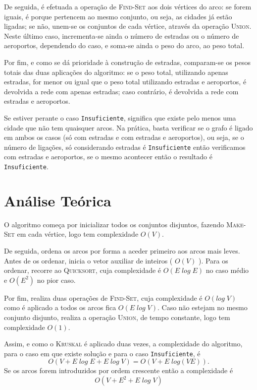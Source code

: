\documentclass[12pt]{article}
\begin{document}
De seguida, é efetuada a operação de \textsc{Find-Set} aos dois vértices do arco: se forem iguais, é porque pertencem ao mesmo conjunto, ou seja, as cidades já estão ligadas; se não, unem-se os conjuntos de cada vértice, através da operação \textsc{Union}. Neste último caso, incrementa-se ainda o número de estradas ou o número de aeroportos, dependendo do caso, e soma-se ainda o peso do arco, ao peso total.

Por fim, e como se dá prioridade à construção de estradas, comparam-se os pesos totais das duas aplicações do algoritmo: se o peso total, utilizando apenas estradas, for menor ou igual que o peso total utilizando estradas e aeroportos, é devolvida a rede com apenas estradas; caso contrário, é devolvida a rede com estradas e aeroportos.

Se estiver perante o caso \texttt{Insuficiente}, significa que existe pelo menos uma cidade que não tem quaisquer arcos. Na prática, basta verificar se o grafo é ligado em ambos os casos (só com estradas e com estradas e aeroportos), ou seja, se o número de ligações, só considerando estradas é \texttt{Insuficiente} então verificamos com estradas e aeroportos, se o mesmo acontecer então o resultado é \texttt{Insuficiente}.


\section*{Análise Teórica}
O algoritmo começa por inicializar todos os conjuntos disjuntos, fazendo \textsc{Make-Set} em cada vértice, logo tem complexidade $O(V)$.

De seguida, ordena os arcos por forma a aceder primeiro aos arcos mais leves. Antes de os ordenar, inicia o vetor auxiliar de inteiros ( $O(V)$ ). Para os ordenar, recorre ao \textsc{Quicksort}, cuja complexidade é $O(E\;log\;E)$ no caso médio e $O(E^2)$ no pior caso.

Por fim, realiza duas operações de \textsc{Find-Set}, cuja complexidade é $O(log\;V)$ como é aplicado a todos os arcos fica $O(E\;log\;V)$. Caso não estejam no mesmo conjunto disjunto, realiza a operação \textsc{Union}, de tempo constante, logo tem complexidade $O(1)$.

Assim, e como o \textsc{Kruskal} é aplicado duas vezes, a complexidade do algoritmo, para o caso em que existe solução e para o caso \texttt{Insuficiente}, é $$O(V + E\;log\;E + E\;log\;V) = O(V + E\;log(VE)).$$
Se os arcos forem introduzidos por ordem crescente então a complexidade é
$$O(V + E^2 + E\;log\;V)$$
\end{document}

